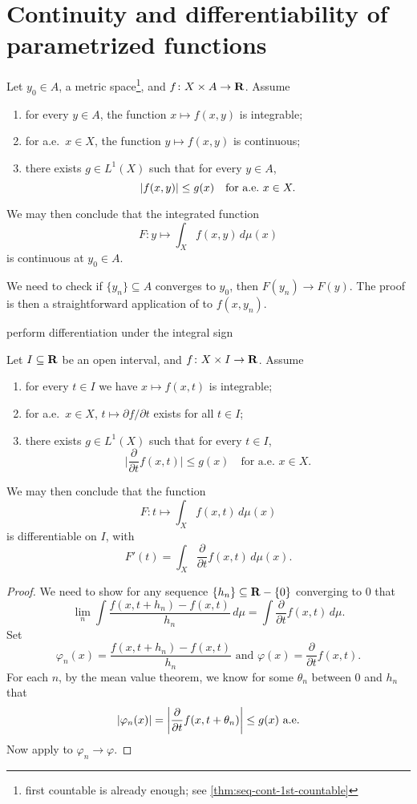 \section{Continuity and differentiability of parametrized functions} \label{sec:cont-diff-parameter-func}

\begin{cor}
Let $y_0 \in A$, a metric space\footnote{first countable is already enough; see \cref{thm:seq-cont-1st-countable}}, and $f \colon X \times A \to \mathbf{R}$. Assume \begin{enumerate}
    \item for every $y \in A$, the function $x \mapsto f(x,y)$ is integrable;
    \item for a.e.\ $x \in X$, the function $y \mapsto f(x,y)$ is continuous;
    \item there exists $g\in L^1(X)$ such that for every $y \in A$, \[\lvert f(x,y) \rvert \leq g(x) \quad \text{for a.e.\ } x\in X.\]
\end{enumerate}
    We may then conclude that the integrated function \[
        F \colon y \mapsto \int_{X} f(x,y)\,d\mu(x)
    \] is continuous at $y_0 \in A$.
\end{cor}
    We need to check if $\{y_n\} \subseteq A$ converges to $y_0$, then $F(y_n) \to F(y)$. The proof is then a straightforward application of  to $f(x,y_n)$.


perform differentiation under the integral sign
\begin{cor} \label{cor:diff-int}
    Let $I \subseteq \mathbf{R}$ be an open interval, and $f\colon X \times I \to \mathbf{R}$. Assume \begin{enumerate}
        \item for every $t\in I$ we have $x \mapsto f(x,t)$ is integrable;
        \item for a.e.\ $x \in X$, $t \mapsto \partial f / \partial t$ exists for all $t \in I$;
        \item there exists $g \in L^1(X)$ such that for every $t \in I$, \[
            \biggl\vert\frac{\partial}{\partial t}f(x,t)\biggr\vert \leq g(x) \quad \text{for a.e.\ } x\in X.
        \]
    \end{enumerate}
    We may then conclude that the function \[
        F\colon t \mapsto \int_X f(x,t)\,d\mu(x)
    \] is differentiable on $I$, with \[
        F'(t) = \int_X \frac{\partial}{\partial t}{f(x,t)}\,d\mu(x).
    \]
\end{cor}
\begin{proof}
    We need to show for any sequence $\{h_n\} \subseteq \mathbf{R} - \{0\}$ converging to $0$ that \[
        \lim_n \int \frac{f(x,t + h_n) - f(x,t)}{h_n}\,d\mu = \int \frac{\partial}{\partial t}{f(x,t)}\,d\mu.
    \] Set \[\varphi_n(x) = \frac{f(x,t + h_n) - f(x,t)}{h_n}\text{ and }\varphi(x) = \frac{\partial}{\partial t}{f(x,t)}.\] For each $n$, by the mean value theorem, we know for some $\theta_n$ between $0$ and $h_n$ that\[
        \lvert \varphi_n(x) \rvert = \biggl\vert \frac{\partial}{\partial t}f(x, t + \theta_n)\biggr\vert \leq g(x) \text{ a.e.}
    \] Now apply  to $\varphi_n \to \varphi$.
\end{proof}

